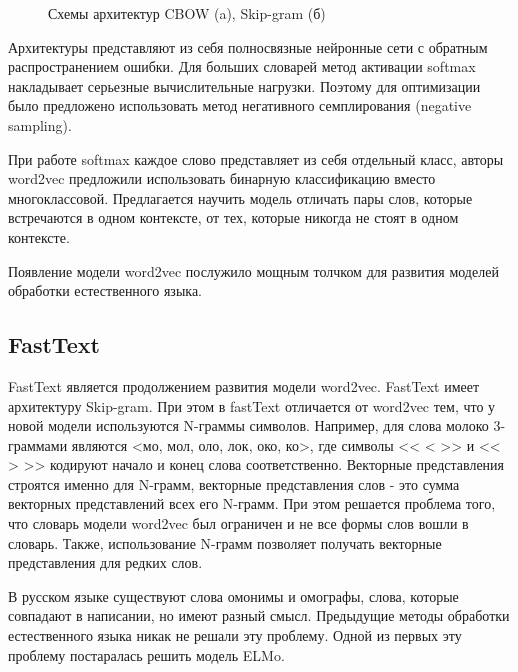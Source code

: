 \documentclass[a4paper,14pt]{article}
\begin{document}
\begin{figure}[H]
\begin{minipage}[h]{0.49\linewidth}
	\end{minipage}
	\caption{Схемы архитектур CBOW (a), Skip-gram (б)}
	\label{fig:word2vec}
\end{figure}

Архитектуры представляют из себя полносвязные нейронные сети с обратным распространением ошибки.
Для больших словарей метод активации softmax накладывает серьезные вычислительные нагрузки.
Поэтому для оптимизации было предложено использовать метод негативного семплирования (negative sampling).

При работе softmax каждое слово  представляет из себя отдельный класс, авторы word2vec предложили использовать бинарную классификацию вместо многоклассовой.
Предлагается научить модель отличать пары слов, которые встречаются в одном контексте, от тех, которые никогда не стоят в одном контексте.

Появление модели word2vec послужило мощным толчком для развития моделей обработки естественного языка.


\subsection{FastText}

FastText является продолжением развития модели word2vec.
FastText имеет архитектуру Skip-gram.
При этом в fastText отличается от word2vec тем, что у новой модели используются N-граммы символов.
Например, для слова молоко 3-граммами являются <мо, мол, оло, лок, око, ко>, где символы << < >> и << > >> кодируют начало и конец слова соответственно.
Векторные представления строятся именно для N-грамм, векторные представления слов - это сумма векторных представлений всех его N-грамм.
При этом решается проблема того, что словарь модели word2vec был ограничен и не все формы слов вошли в словарь.
Также, использование N-грамм позволяет получать векторные представления для редких слов.

В русском языке существуют слова омонимы и омографы, слова, которые совпадают в написании, но имеют разный смысл.
Предыдущие методы обработки естественного языка никак не решали эту проблему.
Одной из первых эту проблему постаралась решить модель ELMo.
\end{document}

